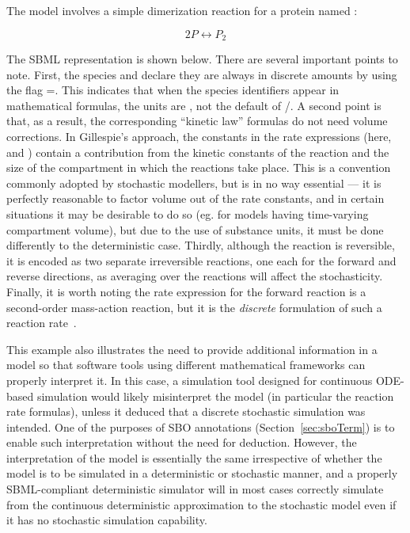 The model involves a simple dimerization reaction for a protein
named :
\begin{linenomath}
\begin{equation*}
    2 P  \leftrightarrow  P_2
\end{equation*}
\end{linenomath}
The SBML representation is shown below.  There are several
important points to note.  First, the species  and 
declare they are always in discrete amounts by using the flag
=.  This indicates that
when the species identifiers appear in mathematical formulas, the
units are , not the default of
/.  A second point is that, as
a result, the corresponding ``kinetic law'' formulas do not need
volume corrections.  In Gillespie's approach, the constants in the
rate expressions (here,  and ) contain a
contribution from the kinetic constants of the reaction and the
size of the compartment in which the reactions take
place. This is a convention commonly adopted by stochastic
modellers, but is in no way essential --- it is perfectly
reasonable to factor volume out of the rate constants, and in
certain situations it may be desirable to do so (eg. for models having
time-varying compartment volume), but due to the use of substance
units, it must be done differently to the deterministic case.
Thirdly, although the reaction is reversible, it is encoded as two
separate irreversible reactions, one each for the forward and
reverse directions, as averaging over the reactions will affect
the stochasticity.
Finally, it is worth noting the rate expression for the forward
reaction is a second-order mass-action reaction, but it is the
\emph{discrete} formulation of such a reaction
rate~\citep{gillespie:1977}.


This example also illustrates the need to provide additional
information in a model so that software tools using different
mathematical frameworks can properly interpret it.  In this case,
a simulation tool designed for continuous ODE-based simulation
would likely misinterpret the model (in particular the reaction
rate formulas), unless it deduced that a discrete stochastic
simulation was intended.  One of the purposes of SBO annotations
(Section~\ref{sec:sboTerm}) is to enable such interpretation
without the need for deduction. However, the interpretation of the
model is essentially the same irrespective of whether the model is
to be simulated in a deterministic or stochastic manner, and a
properly SBML-compliant deterministic simulator will in most cases
correctly simulate from the continuous deterministic approximation
to the stochastic model even if it has no stochastic simulation
capability.

